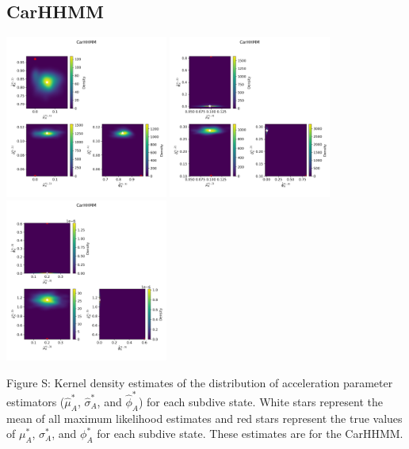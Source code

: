 \documentclass{article}
\begin{document}
        \subsection{CarHHMM}
        \begin{center}
        \includegraphics[width=2.1in]{../Plots/hhmm_V_MLE_density_A_0_0.png}
        \includegraphics[width=2.1in]{../Plots/hhmm_V_MLE_density_A_0_1.png}
        \includegraphics[width=2.1in]{../Plots/hhmm_V_MLE_density_A_0_2.png}
        \end{center}
        
        \noindent Figure S: Kernel density estimates of the distribution of acceleration parameter estimators ($\hat \mu^*_A$, $\hat \sigma^*_A$, and $\hat \phi^*_A$) for each subdive state. White stars represent the mean of all maximum likelihood estimates and red stars represent the true values of $\mu^*_A$, $\sigma^*_A$, and $\phi^*_A$ for each subdive state. These estimates are for the CarHHMM. 
        \addtocounter{fignum}{1}
        
\end{document}
